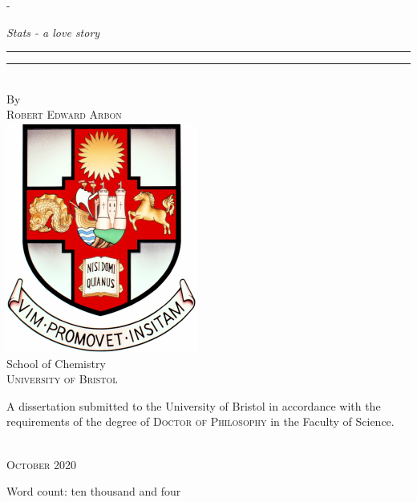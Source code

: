 \begin{titlingpage}
\begin{SingleSpace}
\begin{adjustwidth*}{\unitlength}{-\unitlength}
\begin{center}
{\Large \textit{Stats - a love story}}\\
\rule[0.5ex]{\linewidth}{1pt}\vspace*{-\baselineskip}\vspace{3.2pt}
\rule[0.5ex]{\linewidth}{2pt}\\
\vspace{6.5mm}
{\large By}\\
\vspace{6.5mm}
{\large\textsc{Robert Edward Arbon}}\\
\vspace{11mm}
\includegraphics[scale=0.6]{logos/bristolcrest_colour}\\
\vspace{6mm}
{\large School of Chemistry\\
\textsc{University of Bristol}}\\
\vspace{11mm}
\begin{minipage}{10cm}
A dissertation submitted to the University of Bristol in accordance with the requirements of the degree of \textsc{Doctor of Philosophy} in the Faculty of Science.
\end{minipage}\\
\vspace{9mm}
{\large\textsc{October 2020}}
\vspace{12mm}
\end{center}
\begin{flushright}
{\small Word count: ten thousand and four}
\end{flushright}
\end{adjustwidth*}
\end{SingleSpace}
\end{titlingpage}
